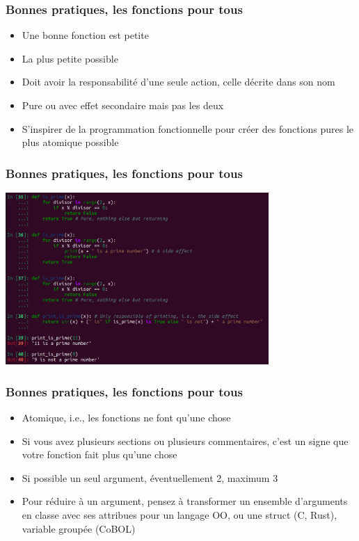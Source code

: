 \documentclass{beamer}
\begin{document}
    \begin{frame}
        \transdissolve
        \frametitle{Bonnes pratiques, les fonctions pour tous}

        \begin{itemize}

            \item Une bonne fonction est petite
            \item La plus petite possible
            \item Doit avoir la responsabilité d'une seule action, celle décrite dans son nom
            \item Pure ou avec effet secondaire mais pas les deux
            \item S'inspirer de la programmation fonctionnelle pour créer des fonctions pures le plus atomique possible

        \end{itemize}
    \end{frame}

    \begin{frame}
        \transdissolve
        \frametitle{Bonnes pratiques, les fonctions pour tous}

        \centering
        \includegraphics[width=10cm]{image/pure-se-functions.png}
    \end{frame}

    \begin{frame}
        \transdissolve
        \frametitle{Bonnes pratiques, les fonctions pour tous}
        \begin{itemize}

            \item Atomique, i.e., les fonctions ne font qu'une chose
            \item Si vous avez plusieurs sections ou plusieurs commentaires, c'est un signe que votre fonction fait plus qu'une chose
            \item Si possible un seul argument, éventuellement 2, maximum 3
            \item Pour réduire à un argument, pensez à transformer un ensemble d'arguments en classe avec ses attribues pour un langage OO, ou une struct (C, Rust), variable groupée (CoBOL)

        \end{itemize}
    \end{frame}
\end{document}

